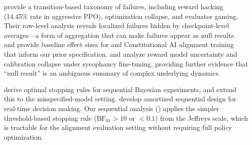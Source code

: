 \citet{abahana2026rlhf} provide a transition-based taxonomy of \rlhf failures,
including reward hacking (14.45\% rate in aggressive PPO), optimization collapse,
and evaluator gaming. Their row-level analysis reveals localized failures hidden by
checkpoint-level averages---a form of aggregation that can make failures appear as
null results. \citet{bai2022rlhf} and \citet{bai2022cai} provide baseline effect
sizes for \rlhf and Constitutional AI alignment training that inform our prior
specification. \citet{zhu2026reward} and \citet{zhao2026calibration} analyze reward
model uncertainty and calibration collapse under sycophancy fine-tuning, providing
further evidence that ``null result'' is an ambiguous summary of complex underlying
dynamics.

\citet{foster2025stopping} derive optimal stopping rules for sequential Bayesian
experiments, and \citet{robbins2025robust} extend this to the misspecified-model
setting. \citet{foster2021deep} develop amortized sequential design for real-time
decision making. Our sequential analysis () applies the simpler
threshold-based stopping rule ($\mathrm{BF}_{01} > 10$ or $< 0.1$) from the Jeffreys
scale, which is tractable for the alignment evaluation setting without requiring
full policy optimization.
